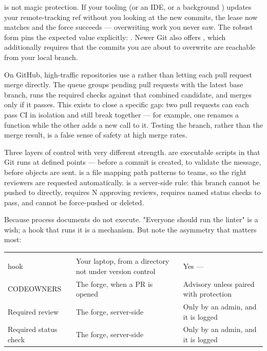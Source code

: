 \begin{misconception}
 is not magic protection. If your tooling (or an IDE, or a background ) updates your remote-tracking ref without you looking at the new commits, the lease now matches and the force succeeds --- overwriting work you never saw. The robust form pins the expected value explicitly: . Newer Git also offers , which additionally requires that the commits you are about to overwrite are reachable from your local branch.
\end{misconception}

 On GitHub, high-traffic repositories use a  rather than letting each pull request merge directly. The queue groups pending pull requests with the latest base branch, runs the required checks against that combined candidate, and merges only if it passes. This exists to close a specific gap: two pull requests can each pass CI in isolation and still break  together --- for example, one renames a function while the other adds a new call to it. Testing the branch, rather than the merge result, is a false sense of safety at high merge rates.


 Three layers of control with very different strength.  are executable scripts in  that Git runs at defined points ---  before a commit is created,  to validate the message,  before objects are sent.  is a file mapping path patterns to teams, so the right reviewers are requested automatically.  is a server-side rule: this branch cannot be pushed to directly, requires N approving reviews, requires named status checks to pass, and cannot be force-pushed or deleted.

 Because process documents do not execute. "Everyone should run the linter" is a wish; a  hook that runs it is a mechanism. But note the asymmetry that matters most:

\begin{center}\small
\wbrowcolors
\begin{tabularx}{\linewidth}{@{}L{30mm} X C{22mm}@{}}
 &  & \\
 hook & Your laptop, from a directory not under version control & Yes --- \\
CODEOWNERS & The forge, when a PR is opened & Advisory unless paired with protection\\
Required review & The forge, server-side & Only by an admin, and it is logged\\
Required status check & The forge, server-side & Only by an admin, and it is logged\\
\end{tabularx}
\end{center}

